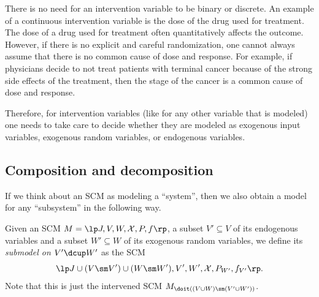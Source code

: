 There is no need for an intervention variable to be binary or discrete.
An example of a continuous intervention variable is the dose of the drug used for treatment.
The dose of a drug used for treatment often quantitatively affects the outcome. 
However, if there is no explicit and careful randomization, one cannot always assume that there is no common cause of dose and response. 
For example, if physicians decide to not treat patients with terminal cancer because of the strong side effects of the treatment, then the stage of the cancer is a common cause of dose and response.

Therefore, for intervention variables (like for any other variable that is modeled) one needs to take care to decide whether they
are modeled as exogenous input variables, exogenous random variables, or endogenous variables.

\subsection{Composition and decomposition}


If we think about an SCM as modeling a ``system'', then we also obtain a model for any ``subsystem'' in the following way.
\begin{Def}\label{def:sub_scm}
  Given an SCM $M = \lt \Sin, \Send, \Srnd, \CX, P, f \rt$, a subset $V' \subseteq V$ of its endogenous variables and a subset $W' \subseteq W$ of its exogenous random variables, we define its \emph{submodel on $V' \dcup W'$} as the SCM
  $$\lt \Sin \cup (V \sm V') \cup (W \sm W'), V', W',\CX,P_{W'},f_{V'} \rt.$$
  Note that this is just the intervened SCM $M_{\doit((V\cup W) \sm (V' \cup W'))}$.
\end{Def}


